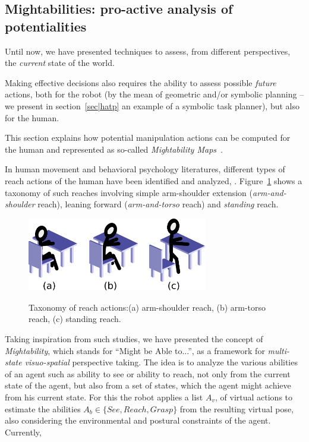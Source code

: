 \documentclass{svmult}
\begin{document}

\subsection{Mightabilities: pro-active analysis of potentialities}

Until now, we have presented techniques to assess, from different perspectives,
the \emph{current} state of the world.

Making effective decisions also requires the ability to assess possible \emph{future}
actions, both for the robot (by the mean of geometric and/or symbolic planning --
we present in section~\ref{sec|hatp} an example of a symbolic task planner), but
also for the human.

This section explains how potential manipulation actions can be computed for
the human and represented as so-called \emph{Mightability Maps}~\cite{Pandey2010}.

In human movement and behavioral psychology literatures, different types of
reach actions of the human have been identified and analyzed,
\cite{Gardner2001, Choi2004}.  Figure~\ref{fig|reaches_taxonomy} shows a taxonomy
of such reaches involving simple arm-shoulder extension (\emph{arm-and-shoulder}
reach), leaning forward (\emph{arm-and-torso} reach) and \emph{standing} reach.

\begin{figure}
  \centering
  \includegraphics[width=0.7\textwidth]{./figs/reach_postures.pdf} \\
  \caption {Taxonomy of reach actions:(a) arm-shoulder reach, (b) arm-torso 
  reach, (c) standing reach.}
  \label{fig|reaches_taxonomy}
\end{figure}

Taking inspiration from such studies, we have presented the concept of
\emph{Mightability}, which stands for ``Might be Able to...'', as a framework
for \emph{multi-state visuo-spatial} perspective taking. The idea is to analyze
the various abilities of an agent such as ability to see or ability to
reach, not only from the current state of the agent, but also from a set of
states, which the agent might achieve from his current state. For this the
robot applies a list $A_v$, of virtual actions to estimate the abilities
$A_b \in \{See, Reach, Grasp\}$ from the resulting virtual pose, also
considering the environmental and postural constraints of the agent.
Currently,
\end{document}
